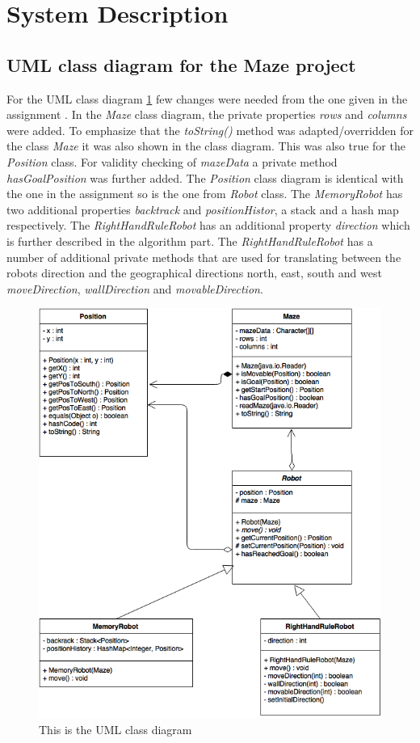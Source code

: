 \documentclass[a4paper,11pt,twoside]{article}
\begin{document}
\section{System Description}

\subsection{UML class diagram for the Maze project}
For the UML class diagram \ref{fig:UML} few changes were needed from
the one given in the assignment \cite{maze}. In the \textit{Maze}
class diagram, the private properties \textit{rows} and
\textit{columns} were added. To emphasize that the \textit{toString()}
method was adapted/overridden for the class \textit{Maze} it was also 
shown in the class diagram. This was also true for the
\textit{Position} class. For validity checking of \textit{mazeData} a
private method \textit{hasGoalPosition} was further added. The
\textit{Position} class diagram is identical with the one in the
assignment so is the one from \textit{Robot} class. The
\textit{MemoryRobot} has two additional properties \textit{backtrack}
and \textit{positionHistor}, a stack and a hash map respectively. The
\textit{RightHandRuleRobot} has an additional property
\textit{direction} which is further described in the algorithm part.
The \textit{RightHandRuleRobot} has a number of additional private
methods that are used for translating between the robots direction and
the geographical directions north, east, south and west
\textit{moveDirection}, \textit{wallDirection} and \textit{movableDirection}. 

\begin{figure}
\centering
\includegraphics[width=\textwidth]{maze.png}
\caption{This is the UML class diagram}
\label{fig:UML}
\end{figure}
\end{document}
